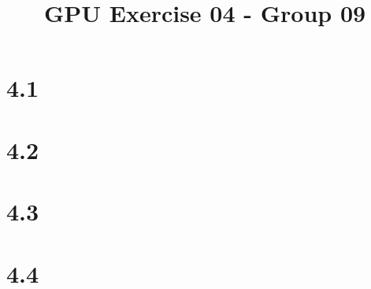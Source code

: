 \documentclass{report}
\begin{document}
\title{GPU Exercise 04 - Group 09}
\maketitle

\section*{4.1}
\section*{4.2}
\section*{4.3}
\section*{4.4}
\end{document}
